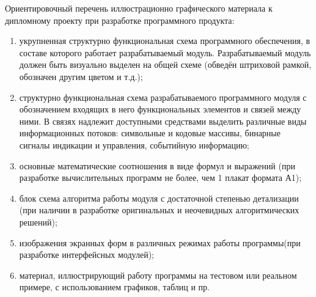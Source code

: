 Ориентировочный перечень иллюстрационно графического материала к дипломному проекту при разработке программного продукта:
\begin{enumerate}
\item  укрупненная структурно функциональная схема программного обеспечения, в составе которого работает разрабатываемый модуль. Разрабатываемый модуль должен быть визуально выделен на общей схеме (обведён штриховой рамкой, обозначен другим цветом и т.д.);
\item  структурно функциональная схема разрабатываемого программного модуля с обозначением входящих в него функциональных элементов и связей между ними. В связях надлежит доступными средствами выделить различные виды информационных потоков: символьные и кодовые массивы, бинарные сигналы индикации и управления, событийную информацию;
\item  основные математические соотношения в виде формул и выражений (при разработке вычислительных программ не более, чем 1 плакат формата А1);
\item  блок схема алгоритма работы модуля с достаточной степенью детализации (при наличии в разработке оригинальных и неочевидных алгоритмических решений);
\item  изображения экранных форм в различных режимах работы программы(при разработке интерфейсных модулей);
\item  материал, иллюстрирующий работу программы на тестовом или реальном примере, с использованием графиков, таблиц и пр.
\end{enumerate}